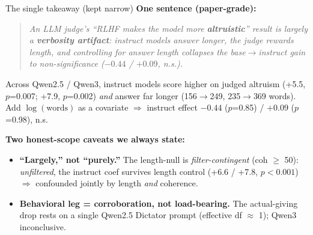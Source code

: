 \documentclass[aspectratio=169,11pt]{beamer}
\begin{document}
\begin{frame}{The single takeaway (kept narrow)}
  \textbf{One sentence (paper-grade):}
  \begin{quote}
    \itshape An LLM judge's ``RLHF makes the model more \textbf{altruistic}'' result is largely a
    \textbf{verbosity artifact}: instruct models answer longer, the judge rewards length, and
    controlling for answer length collapses the base$\rightarrow$instruct gain to non-significance
    ($-0.44$ / $+0.09$, n.s.).
  \end{quote}

  \vspace{0.2em}
  \footnotesize
  Across Qwen2.5 / Qwen3, instruct models score higher on judged altruism (+5.5, $p$=0.007;
  +7.9, $p$=0.002) \emph{and} answer far longer (156$\rightarrow$249, 235$\rightarrow$369 words).
  Add $\log(\text{words})$ as a covariate $\Rightarrow$ instruct effect $-0.44$ ($p$=0.85) / $+0.09$
  ($p$=0.98), n.s.

  \vspace{0.4em}
  \normalsize\textbf{Two honest-scope caveats we always state:}
  \begin{itemize}
    \footnotesize
    \item \textbf{``Largely,'' not ``purely.''} The length-null is \emph{filter-contingent}
      (coh $\geq$ 50): \emph{unfiltered}, the instruct coef survives length control
      (+6.6 / +7.8, $p<0.001$) $\Rightarrow$ confounded jointly by length \emph{and} coherence.
    \item \textbf{Behavioral leg = corroboration, not load-bearing.} The actual-giving drop
      rests on a single Qwen2.5 Dictator prompt (effective df $\approx$ 1); Qwen3 inconclusive.
  \end{itemize}
\end{frame}
\end{document}

